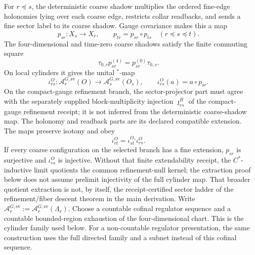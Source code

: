 \begin{definition}
For \(r\preceq s\), the deterministic coarse shadow multiplies the ordered fine-edge
holonomies lying over each coarse edge, restricts collar readbacks, and sends a fine sector label
to its coarse shadow. Gauge covariance makes this a map
\[
p_{sr}:X_s\longrightarrow X_r,
\qquad
p_{tr}=p_{sr}\circ p_{ts}\quad(r\preceq s\preceq t).
\]
The four-dimensional and time-zero coarse shadows satisfy the finite commuting square
\[
\tau_{0,r}p_{sr}^{(4)}=p_{sr}^{(0)}\tau_{0,s}.
\]
On local cylinders it gives the unital \(^*\)-map
\[
\iota_{rs}^{O}:\mathcal A_r^{G,\mathrm{sv}}(O)\longrightarrow
\mathcal A_s^{G,\mathrm{sv}}(O_s),
\qquad
\iota_{rs}^{O}(a)=a\circ p_{sr}.
\]
On the compact-gauge refinement branch, the sector-projector part must agree with the separately
supplied block-multiplicity injection \(\jmath_{rs}^{B}\) of
the compact-gauge refinement receipt; it is not inferred from the deterministic
coarse-shadow map. The holonomy and readback parts are its declared compatible extension. The maps
preserve isotony and obey
\[
\iota_{rt}^{O}=\iota_{st}^{O_s}\iota_{rs}^{O}.
\]
If every coarse configuration on the selected branch has a fine extension, \(p_{sr}\) is
surjective and \(\iota_{rs}^{O}\) is injective. Without that finite extendability receipt, the
\(C^*\)-inductive limit quotients the common refinement-null kernel; the extraction proof below
does not assume prelimit injectivity of the full cylinder map. That broader quotient extraction is
not, by itself, the receipt-certified sector ladder of
the refinement/fiber descent theorem in the main derivation.
Write \(\mathcal A_r^{G,\mathrm{sv}}:=
\mathcal A_r^{G,\mathrm{sv}}(\Lambda_r)\).
Choose a countable cofinal regulator sequence and a countable bounded-region exhaustion of the
four-dimensional chart. This is the cylinder family used below. For a non-countable regulator
presentation, the same construction uses the full directed family and a subnet instead of this
cofinal sequence.
\end{definition}

